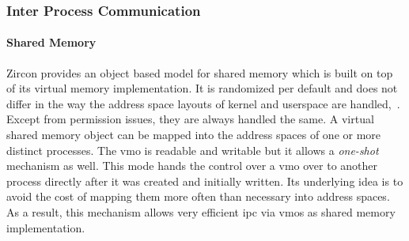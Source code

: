 \subsubsection*{Inter Process Communication}
\paragraph{Shared Memory}
Zircon provides an object based model for shared memory which is built on top of its virtual memory implementation.
It is randomized per default and does not differ in the way the address space layouts of kernel and userspace are handled\cite{zircon-vmo},~\cite{zircon-concepts}.
Except from permission issues, they are always handled the same\cite{zircon-vmar}.
A virtual shared memory object can be mapped into the address spaces of one or more distinct processes.
The \acf{vmo} is readable and writable but it allows a \textit{one-shot} mechanism as well.
This mode hands the control over a \ac{vmo} over to another process directly after it was created and initially written\cite{zircon-concepts}.
Its underlying idea is to avoid the cost of mapping them more often than necessary into address spaces.
As a result, this mechanism allows very efficient \ac{ipc} via \acp{vmo} as shared memory implementation\cite{zircon-concepts}.

